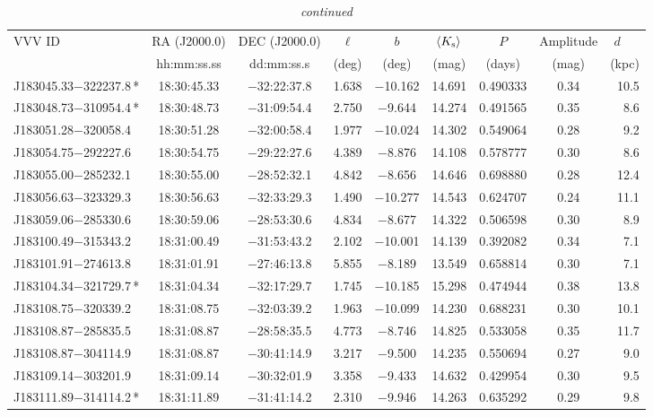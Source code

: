 \begin{table*}
\centering
\caption[]{{\it continued}}
\begin{tabular}{lcccccccr}
\hline \hline
VVV ID & RA (J2000.0)  & DEC (J2000.0) & $\ell$ & $b$ &  $\langle K_{\rm s} \rangle$ & $P$ & Amplitude & $d$~~~ \\
     & hh:mm:ss.ss    & dd:mm:ss.s   &  (deg) & (deg) &   (mag)       & (days) & (mag) & (kpc)   \\
\hline
J183045.33$-$322237.8\,* & 18:30:45.33 & $-$32:22:37.8 &  1.638 & $-$10.162 & 14.691 & 0.490333 & 0.34 & 10.5 \\
J183048.73$-$310954.4\,* & 18:30:48.73 & $-$31:09:54.4 &  2.750 & $-$9.644 & 14.274 & 0.491565 & 0.35 & 8.6 \\
J183051.28$-$320058.4 & 18:30:51.28 & $-$32:00:58.4 &  1.977 & $-$10.024 & 14.302 & 0.549064 & 0.28 & 9.2 \\
J183054.75$-$292227.6 & 18:30:54.75 & $-$29:22:27.6 &  4.389 & $-$8.876 & 14.108 & 0.578777 & 0.30 & 8.6 \\
J183055.00$-$285232.1 & 18:30:55.00 & $-$28:52:32.1 &  4.842 & $-$8.656 & 14.646 & 0.698880 & 0.28 & 12.4 \\
J183056.63$-$323329.3 & 18:30:56.63 & $-$32:33:29.3 &  1.490 & $-$10.277 & 14.543 & 0.624707 & 0.24 & 11.1 \\
J183059.06$-$285330.6 & 18:30:59.06 & $-$28:53:30.6 &  4.834 & $-$8.677 & 14.322 & 0.506598 & 0.30 & 8.9 \\
J183100.49$-$315343.2 & 18:31:00.49 & $-$31:53:43.2 &  2.102 & $-$10.001 & 14.139 & 0.392082 & 0.34 & 7.1 \\
J183101.91$-$274613.8 & 18:31:01.91 & $-$27:46:13.8 &  5.855 & $-$8.189 & 13.549 & 0.658814 & 0.30 & 7.1 \\
J183104.34$-$321729.7\,* & 18:31:04.34 & $-$32:17:29.7 &  1.745 & $-$10.185 & 15.298 & 0.474944 & 0.38 & 13.8 \\
J183108.75$-$320339.2 & 18:31:08.75 & $-$32:03:39.2 &  1.963 & $-$10.099 & 14.230 & 0.688231 & 0.30 & 10.1 \\
J183108.87$-$285835.5 & 18:31:08.87 & $-$28:58:35.5 &  4.773 & $-$8.746 & 14.825 & 0.533058 & 0.35 & 11.7 \\
J183108.87$-$304114.9 & 18:31:08.87 & $-$30:41:14.9 &  3.217 & $-$9.500 & 14.235 & 0.550694 & 0.27 & 9.0 \\
J183109.14$-$303201.9 & 18:31:09.14 & $-$30:32:01.9 &  3.358 & $-$9.433 & 14.632 & 0.429954 & 0.30 & 9.5 \\
J183111.89$-$314114.2\,* & 18:31:11.89 & $-$31:41:14.2 &  2.310 & $-$9.946 & 14.263 & 0.635292 & 0.29 & 9.8 \\

\end{tabular}
\end{table*}
